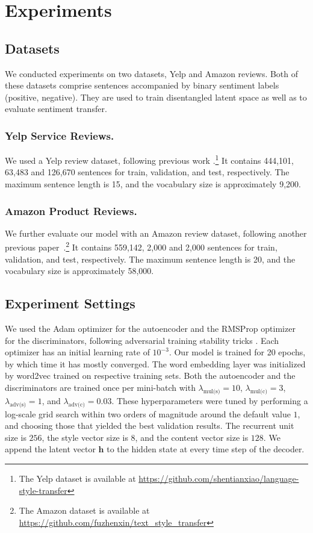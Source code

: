\documentclass[letterpaper]{article} %
\newcommand{\hyp}[1]{\lambda_{\text{#1}}}
\begin{document}
\section{Experiments}

\subsection{Datasets}

We conducted experiments on two datasets, Yelp and Amazon reviews.
Both of these datasets comprise sentences accompanied by binary sentiment labels (positive, negative). They are used to train disentangled latent space as well as to evaluate sentiment transfer.

\subsubsection{Yelp Service Reviews.}
We used a Yelp review dataset, following previous work \cite{shen2017style,zhao2018adversarially}.\footnote{The Yelp dataset is available at \url{https://github.com/shentianxiao/language-style-transfer}}
It contains 444,101, 63,483 and 126,670 sentences for train, validation, and test, respectively.
The maximum sentence length is 15, and the vocabulary size is approximately 9,200.

\subsubsection{Amazon Product Reviews.}
We further evaluate our model with an Amazon review dataset, following another previous paper~\cite{fu2018style}.\footnote{The Amazon dataset is available at \url{https://github.com/fuzhenxin/text_style_transfer}}
It contains 559,142, 2,000 and 2,000 sentences for train, validation, and test, respectively.
The maximum sentence length is 20, and the vocabulary size is approximately 58,000.


\subsection{Experiment Settings}
We used the Adam optimizer \cite{kingma2014adam} for the autoencoder and the RMSProp optimizer \cite{tieleman2012lecture} for the discriminators, following adversarial training stability tricks \cite{arjovsky2017wasserstein}.
Each optimizer has an initial learning rate of $10^{-3}$.
Our model is trained for 20 epochs, by which time it has mostly converged.
The word embedding layer was initialized by word2vec \cite{mikolov2013distributed} trained on respective training sets.
Both the autoencoder and the discriminators are trained once per mini-batch with $\hyp{mul(s)} = 10$, $\hyp{mul(c)} = 3$, $\hyp{adv(s)} = 1$, and $\hyp{adv(c)} = 0.03$.
These hyperparameters were tuned by performing a log-scale grid search within two orders of magnitude around the default value $1$, and choosing those that yielded the best validation results.
The recurrent unit size is $256$, the style vector size is $8$, and the content vector size is $128$.
We append the latent vector $\bm h$ to the hidden state at every time step of the decoder.
\end{document}
